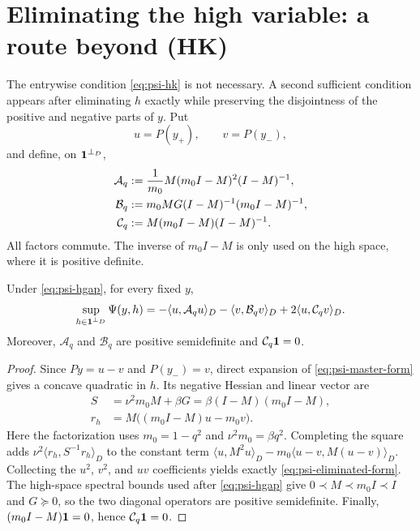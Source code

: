 \documentclass[11pt]{article}
\begin{document}
\section{Eliminating the high variable: a route beyond \textup{(HK)}}

The entrywise condition \cref{eq:psi-hk} is not necessary.  A second
sufficient condition appears after eliminating $h$ exactly while preserving
the disjointness of the positive and negative parts of $y$.  Put
\begin{equation}
 u=P(y_+),\qquad v=P(y_-),
 \label{eq:psi-eliminate-uv}
\end{equation}
and define, on $\mathbf{1}^{\perp_D}$,
\begin{align}
 \mathcal A_q
 &:=\frac1{m_0}M(m_0I-M)^2(I-M)^{-1},\notag\\
 \mathcal B_q
 &:=m_0MG(I-M)^{-1}(m_0I-M)^{-1},\notag\\
 \mathcal C_q
 &:=M(m_0I-M)(I-M)^{-1}.
 \label{eq:psi-abc-kernels}
\end{align}
All factors commute.  The inverse of $m_0I-M$ is only used on the high
space, where it is positive definite.

\begin{lemma}
\label{lem:psi-eliminate-h}
Under \cref{eq:psi-hgap}, for every fixed $y$,
\begin{equation}
 \sup_{h\in\mathbf{1}^{\perp_D}}\Psi(y,h)
 =-\langle u,\mathcal A_qu\rangle_D
  -\langle v,\mathcal B_qv\rangle_D
  +2\langle u,\mathcal C_qv\rangle_D.
 \label{eq:psi-eliminated-form}
\end{equation}
Moreover, $\mathcal A_q$ and $\mathcal B_q$ are positive semidefinite and
$\mathcal C_q\mathbf{1}=0$.
\end{lemma}

\begin{proof}
Since $Py=u-v$ and $P(y_-)=v$, direct expansion of
\cref{eq:psi-master-form} gives a concave quadratic in $h$.  Its negative
Hessian and linear vector are
\begin{align*}
 S&=\nu^2m_0M+\beta G
   =\beta(I-M)(m_0I-M),\\
 r_h&=M\bigl((m_0I-M)u-m_0v\bigr).
\end{align*}
Here the factorization uses $m_0=1-q^2$ and
$\nu^2m_0=\beta q^2$.  Completing the square adds
$\nu^2\langle r_h,S^{-1}r_h\rangle_D$ to the constant term
$\langle u,M^2u\rangle_D-m_0\langle u-v,M(u-v)\rangle_D$.
Collecting the $u^2$, $v^2$, and $uv$ coefficients yields exactly
\cref{eq:psi-eliminated-form}.  The high-space spectral bounds used after
\cref{eq:psi-hgap} give $0\prec M\prec m_0I\prec I$ and $G\succeq0$, so
the two diagonal operators are positive semidefinite.  Finally,
$(m_0I-M)\mathbf{1}=0$, hence $\mathcal C_q\mathbf{1}=0$.
\end{proof}
\end{document}
